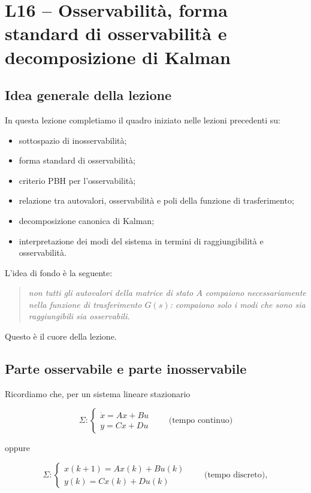 \chapter{L16 -- Osservabilità, forma standard di osservabilità e decomposizione di Kalman}
\label{chap:L16}

\section{Idea generale della lezione}

In questa lezione completiamo il quadro iniziato nelle lezioni precedenti su:
\begin{itemize}
    \item sottospazio di inosservabilità;
    \item forma standard di osservabilità;
    \item criterio PBH per l'osservabilità;
    \item relazione tra autovalori, osservabilità e poli della funzione di trasferimento;
    \item decomposizione canonica di Kalman;
    \item interpretazione dei modi del sistema in termini di raggiungibilità e osservabilità.
\end{itemize}

L'idea di fondo è la seguente:

\begin{quote}
\emph{non tutti gli autovalori della matrice di stato \(A\) compaiono necessariamente nella funzione di trasferimento \(G(s)\): compaiono solo i modi che sono sia raggiungibili sia osservabili.}
\end{quote}

Questo è il cuore della lezione.

\bigskip

\section{Parte osservabile e parte inosservabile}

Ricordiamo che, per un sistema lineare stazionario

\[
\Sigma:
\begin{cases}
\dot x = Ax + Bu \\
y = Cx + Du
\end{cases}
\qquad\text{(tempo continuo)}
\]

oppure

\[
\Sigma:
\begin{cases}
x(k+1) = Ax(k) + Bu(k) \\
y(k) = Cx(k) + Du(k)
\end{cases}
\qquad\text{(tempo discreto)},
\]

